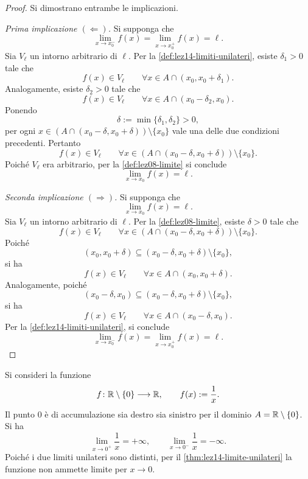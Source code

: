 \begin{proof}
Si dimostrano entrambe le implicazioni.

\emph{Prima implicazione \((\Leftarrow)\).}
Si supponga che
\[
  \lim_{x\to x_0^-}f(x)
  =\lim_{x\to x_0^+}f(x)=\ell.
\]
Sia \(V_\ell\) un intorno arbitrario di \(\ell\).
Per la \cref{def:lez14-limiti-unilateri}, esiste
\(\delta_1>0\) tale che
\[
  f(x)\in V_\ell
  \qquad\forall x\in A\cap(x_0,x_0+\delta_1).
\]
Analogamente, esiste \(\delta_2>0\) tale che
\[
  f(x)\in V_\ell
  \qquad\forall x\in A\cap(x_0-\delta_2,x_0).
\]
Ponendo
\[
  \delta:=\min\{\delta_1,\delta_2\}>0,
\]
per ogni \(x\in(A\cap(x_0-\delta,x_0+\delta))
\setminus\{x_0\}\) vale una delle due condizioni
precedenti. Pertanto
\[
  f(x)\in V_\ell
  \qquad\forall x\in
  (A\cap(x_0-\delta,x_0+\delta))\setminus\{x_0\}.
\]
Poiché \(V_\ell\) era arbitrario, per la
\cref{def:lez08-limite} si conclude
\[
  \lim_{x\to x_0}f(x)=\ell.
\]

\emph{Seconda implicazione \((\Rightarrow)\).}
Si supponga che
\[
  \lim_{x\to x_0}f(x)=\ell.
\]
Sia \(V_\ell\) un intorno arbitrario di \(\ell\).
Per la \cref{def:lez08-limite}, esiste \(\delta>0\)
tale che
\[
  f(x)\in V_\ell
  \qquad\forall x\in
  (A\cap(x_0-\delta,x_0+\delta))\setminus\{x_0\}.
\]
Poiché
\[
  (x_0,x_0+\delta)
  \subseteq(x_0-\delta,x_0+\delta)
  \setminus\{x_0\},
\]
si ha
\[
  f(x)\in V_\ell
  \qquad\forall x\in A\cap(x_0,x_0+\delta).
\]
Analogamente, poiché
\[
  (x_0-\delta,x_0)
  \subseteq(x_0-\delta,x_0+\delta)
  \setminus\{x_0\},
\]
si ha
\[
  f(x)\in V_\ell
  \qquad\forall x\in A\cap(x_0-\delta,x_0).
\]
Per la \cref{def:lez14-limiti-unilateri}, si conclude
\[
  \lim_{x\to x_0^-}f(x)
  =\lim_{x\to x_0^+}f(x)=\ell.
\]
\end{proof}

\clearpage

\begin{example}
\label{ex:lez14-limiti-unilateri-inverso}
Si consideri la funzione
\[
  f\colon\mathbb{R}\setminus\{0\}\longrightarrow\mathbb{R},
  \qquad f(x):=\frac1x.
\]
Il punto \(0\) è di accumulazione sia destro sia
sinistro per il dominio \(A=\mathbb{R}\setminus\{0\}\).
Si ha
\[
  \lim_{x\to0^+}\frac1x=+\infty,
  \qquad
  \lim_{x\to0^-}\frac1x=-\infty.
\]
Poiché i due limiti unilateri sono distinti,
per il \cref{thm:lez14-limite-unilateri} la funzione
non ammette limite per \(x\to0\).
\end{example}
